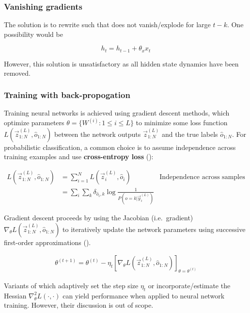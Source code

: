 \subsubsection{Vanishing gradients}

The solution is to rewrite  such that
 does not vanish/explode for large $t - k$.
One possibility would be

\begin{equation}
    h_t = h_{t-1} + \theta_x x_t
\end{equation}

However, this solution is unsatisfactory as all hidden state dynamics have been
removed.


\subsubsection{Training with back-propogation}

Training neural networks is achieved using gradient descent methods, which
optimize parameters $\theta = \{W^{(i)} : 1 \leq i \leq L \}$ to minimize some
loss function $L(\vec{z}^{(L)}_{1:N}, \hat{o}_{1:N})$ between the network
outputs $\vec{z}^{(L)}_{1:N}$ and the true labels $\hat{o}_{1:N}$. For
probabilistic classification, a common choice is to assume independence
across training examples and use \textbf{cross-entropy loss}
():

\begin{align}
    L(\vec{z}^{(L)}_{1:N}, \hat{o}_{1:N})
    &= \sum_{i=1}^{N} L(\vec{z}^{(L)}_i, \hat{o}_i) &\text{Independence across samples} \nonumber\\
    &= \sum_i \sum_k \delta_{\hat{o}_i,k} \log \frac{1}{P(o=k | \vec{y}_i^{(L)})} & \label{eq:cross-entropy-loss}
\end{align}

Gradient descent proceeds by using the Jacobian (i.e.\ gradient) $\nabla_\theta
L(\vec{z}^{(L)}_{1:N}, \hat{o}_{1:N})$ to iteratively update the network
parameters using successive first-order approximations ().

\begin{align}
    \label{eq:nn-training-iteration-scheme}
    \theta^{(t+1)} = \theta^{(t)}
    - \eta_t \left[ \nabla_\theta L(\vec{z}^{(L)}_{1:N}, \hat{o}_{1:N}) \right]_{\theta = \theta^{(t)}}
\end{align}

Variants of  which adaptively set the
step size $\eta_t$ or incorporate/estimate the Hessian $\nabla^2_{\theta}
L(\cdot, \cdot)$ can yield performance when applied to neural network training.
However, their discussion is out of scope. 

